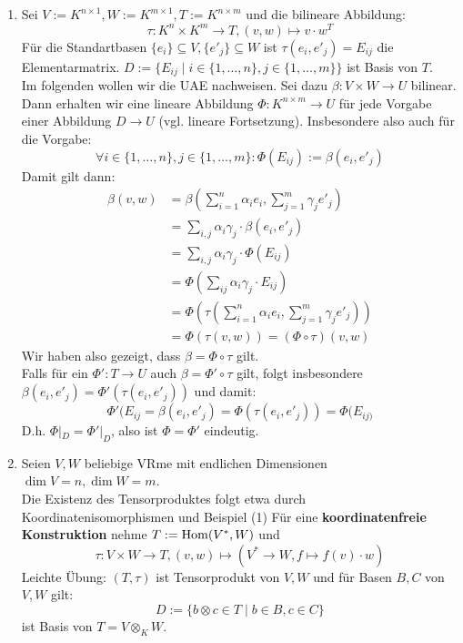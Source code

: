 \documentclass[parskip,a4paper,twoside,DIV15,BCOR12mm]{scrbook}
\begin{document}
\begin{example}
\begin{enumerate}
\item Sei $V:=K^{n\times 1},W:=K^{m\times 1}, T:=K^{n\times m}$ und die bilineare
Abbildung:
\[\tau:K^n\times K^m\to T,(v,w)\mapsto v\cdot w^T\]
Für die Standartbasen $\{e_i\}\subseteq V,\{e'_j\}\subseteq W$ ist $\tau(e_i,e'_j)=E_{ij}$
die Elementarmatrix. $D:=\{E_{ij}\mid i\in\{1,\ldots,n\},j\in\{1,\ldots,m\}\}$ ist
Basis von $T$.\\
Im folgenden wollen wir die UAE nachweisen. Sei dazu $\beta:V\times W\to U$ bilinear.
Dann erhalten wir eine lineare Abbildung $\Phi:K^{n\times m}\to U$ für jede Vorgabe einer
Abbildung $D\to U$ (vgl. lineare Fortsetzung). Insbesondere also auch für die Vorgabe:
\[\forall i\in\{1,\ldots,n\},j\in\{1,\ldots,m\}:\Phi(E_{ij}):=\beta(e_i,e'_j)\]
Damit gilt dann:
\begin{align*}
\beta(v,w)&=\beta\left(\sum_{i=1}^n \alpha_i e_i,\sum_{j=1}^m \gamma_j e'_j\right)\\
&=\sum_{i,j}\alpha_i\gamma_j\cdot\beta(e_i,e'_j)\\
&=\sum_{i,j}\alpha_i\gamma_j\cdot\Phi(E_{ij})\\
&=\Phi\left(\sum_{ij}\alpha_i\gamma_j\cdot E_{ij}\right)\\
&=\Phi\left(\tau\left(\sum_{i=1}^n\alpha_i e_i,\sum_{j=1}^m \gamma_j e'_j\right)\right)\\
&=\Phi(\tau(v,w))=(\Phi\circ\tau)(v,w)
\end{align*}
Wir haben also gezeigt, dass $\beta=\Phi\circ\tau$ gilt.\\
Falls für ein $\Phi':T\to U$ auch $\beta=\Phi'\circ\tau$ gilt, folgt insbesondere
$\beta(e_i,e'_j)=\Phi'(\tau(e_i,e'_j))$ und damit:
\[\Phi'(E_{ij}=\beta(e_i,e'_j)=\Phi(\tau(e_i,e'_j))=\Phi(E_{ij)}\]
D.h. $\Phi|_D=\Phi'|_D$, also ist $\Phi=\Phi'$ eindeutig.
\item Seien $V,W$ beliebige VRme mit endlichen Dimensionen $\dim V=n,\dim W=m$.\\
Die Existenz des Tensorproduktes folgt etwa durch Koordinatenisomorphismen und
Beispiel (1) Für eine \textbf{koordinatenfreie Konstruktion} nehme $T:=\operatorname{Hom}(V^*,W)$ und
\[\tau:V\times W\to T,(v,w)\mapsto(V^*\to W,f\mapsto f(v)\cdot w)\]
Leichte Übung: $(T,\tau)$ ist Tensorprodukt von $V,W$ und für Basen $B,C$ von $V,W$ gilt:
\[D:=\{b\otimes c\in T\mid b\in B,c\in C\}\]
ist Basis von $T=V\otimes_K W$.
\end{enumerate}
\end{example}
\end{document}
